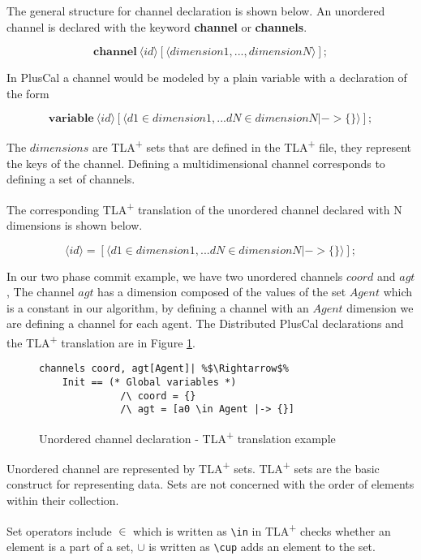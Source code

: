\documentclass[journal]{IEEEtran}
\newcommand{\tlaplus}{TLA\textsuperscript{+}\xspace}
\newcommand{\keyword}[1]{\textbf{#1}}
\newcommand{\entity}[1]{\ensuremath{\langle}#1\ensuremath{\rangle}}
\begin{document}
The general structure for channel declaration is shown below. An unordered channel is declared with the keyword \keyword{channel} or \keyword{channels}. 

\[
 \keyword{channel}\ \entity{id}[\entity{dimension1,...,dimensionN}];
\]

In PlusCal a channel would be modeled by a plain variable with a declaration of the form

\[
 \keyword{variable}\ \entity{id}[\entity{d1 \in dimension1,... dN
  \in dimensionN |-> \{\}}];
\]

The $dimensions$ are \tlaplus sets that are defined in the \tlaplus file, they represent the keys of the channel. Defining a multidimensional channel corresponds to defining a set of channels.

The corresponding \tlaplus translation of the unordered channel declared with N dimensions is shown below.

\[
 \entity{id} = [\entity{d1 \in dimension1,... dN \in dimensionN |-> \{ \}}];
\]

In our two phase commit example, we have two unordered channels $coord$ and $agt$, The channel $agt$ has a dimension composed of the values of the set $Agent$ which is a constant in our algorithm, by defining a channel with an $Agent$ dimension we are defining a channel for each agent.
The Distributed PlusCal declarations and the \tlaplus translation are in Figure \ref{2pcchannels}.


\FloatBarrier
\begin{figure}[!h]
\begin{lstlisting}[frame = none, numbers = none, escapechar=\%]
channels coord, agt[Agent]| %$\Rightarrow$%
	Init == (* Global variables *)
      		  /\ coord = {}
       		  /\ agt = [a0 \in Agent |-> {}]
\end{lstlisting}


\caption{Unordered channel declaration - \tlaplus translation example}
\label{2pcchannels}
\end{figure}
\FloatBarrier

Unordered channel are represented by \tlaplus sets. \tlaplus sets are the basic construct for representing data. Sets are not concerned with the order of elements within their collection.

Set operators include $\in$ which is written as \lstinline|\in| in \tlaplus checks whether an element is a part of a set, $\cup$ is written as \lstinline|\cup| adds an element to the set.\newline
\end{document}
